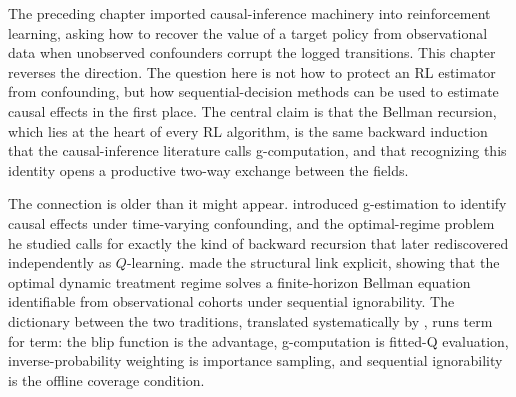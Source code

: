 

The preceding chapter imported causal-inference machinery into reinforcement learning, asking how to recover the value of a target policy from observational data when unobserved confounders corrupt the logged transitions. This chapter reverses the direction. The question here is not how to protect an RL estimator from confounding, but how sequential-decision methods can be used to estimate causal effects in the first place. The central claim is that the Bellman recursion, which lies at the heart of every RL algorithm, is the same backward induction that the causal-inference literature calls g-computation, and that recognizing this identity opens a productive two-way exchange between the fields.

The connection is older than it might appear. \citet{robins1986} introduced g-estimation to identify causal effects under time-varying confounding, and the optimal-regime problem he studied calls for exactly the kind of backward recursion that \citet{watkins1992_paper} later rediscovered independently as $Q$-learning. \citet{murphy2003dtr} made the structural link explicit, showing that the optimal dynamic treatment regime solves a finite-horizon Bellman equation identifiable from observational cohorts under sequential ignorability. The dictionary between the two traditions, translated systematically by \citet{schulte2014qlearning}, runs term for term: the blip function is the advantage, g-computation is fitted-Q evaluation, inverse-probability weighting is importance sampling, and sequential ignorability is the offline coverage condition.

